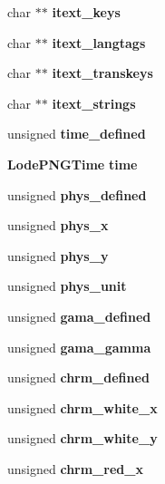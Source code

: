 \begin{DoxyCompactItemize}
\item 
\mbox{\label{struct_lode_p_n_g_info_a1b909e03596abf86d564641741b0087f}} 
char $\ast$$\ast$ {\bfseries itext\+\_\+keys}
\item 
\mbox{\label{struct_lode_p_n_g_info_ae9f9f594e63c910d467a14f550960837}} 
char $\ast$$\ast$ {\bfseries itext\+\_\+langtags}
\item 
\mbox{\label{struct_lode_p_n_g_info_a93a8e823ac715dbdd625f023d8fdebc2}} 
char $\ast$$\ast$ {\bfseries itext\+\_\+transkeys}
\item 
\mbox{\label{struct_lode_p_n_g_info_a7014fd40ffeb1d482f72d33c020cf73e}} 
char $\ast$$\ast$ {\bfseries itext\+\_\+strings}
\item 
\mbox{\label{struct_lode_p_n_g_info_a9adb9f74ab90716ae107b99da5384424}} 
unsigned {\bfseries time\+\_\+defined}
\item 
\mbox{\label{struct_lode_p_n_g_info_a4d3407acdf79bf87f20a3562f210b393}} 
\textbf{ Lode\+P\+N\+G\+Time} {\bfseries time}
\item 
\mbox{\label{struct_lode_p_n_g_info_a9b8e29b7e7b4908a2de0275e01a828ed}} 
unsigned {\bfseries phys\+\_\+defined}
\item 
\mbox{\label{struct_lode_p_n_g_info_a1593fa6e1acc93f3b9de51c340bef94d}} 
unsigned {\bfseries phys\+\_\+x}
\item 
\mbox{\label{struct_lode_p_n_g_info_a52ad7a105244d00f1e91c489eaf53f97}} 
unsigned {\bfseries phys\+\_\+y}
\item 
\mbox{\label{struct_lode_p_n_g_info_ad6f2171d9f87716e5010f6c5352f9855}} 
unsigned {\bfseries phys\+\_\+unit}
\item 
\mbox{\label{struct_lode_p_n_g_info_a60d6edb00a28a423dbd1bf2a693a16b0}} 
unsigned {\bfseries gama\+\_\+defined}
\item 
\mbox{\label{struct_lode_p_n_g_info_afd1e6f7f1fe1c473774a64148dfed25a}} 
unsigned {\bfseries gama\+\_\+gamma}
\item 
\mbox{\label{struct_lode_p_n_g_info_a8ada4ce0104dcb58bb7d0cbc8146c9eb}} 
unsigned {\bfseries chrm\+\_\+defined}
\item 
\mbox{\label{struct_lode_p_n_g_info_a71cf7e4f8837406061c3f045d7fc3006}} 
unsigned {\bfseries chrm\+\_\+white\+\_\+x}
\item 
\mbox{\label{struct_lode_p_n_g_info_a566d09783ce366924e246703132b074a}} 
unsigned {\bfseries chrm\+\_\+white\+\_\+y}
\item 
\mbox{\label{struct_lode_p_n_g_info_a1aef46690f4e090ec7ba2198dc25a0f7}} 
unsigned {\bfseries chrm\+\_\+red\+\_\+x}
\item 

\end{DoxyCompactItemize}
